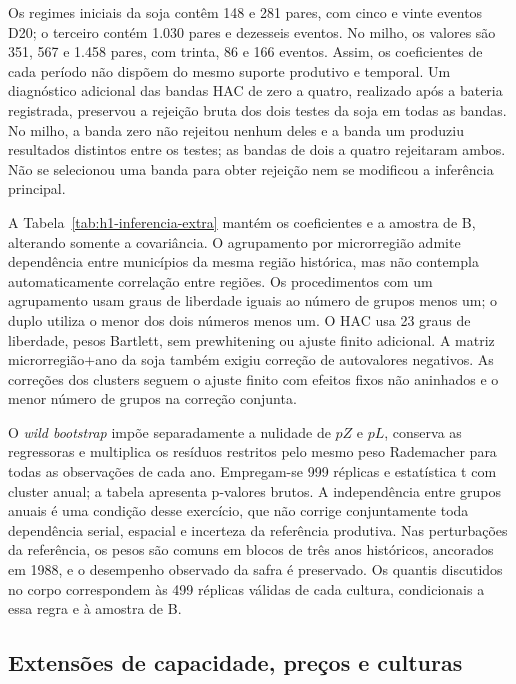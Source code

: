 
\FloatBarrier

Os regimes iniciais da soja contêm 148 e 281 pares, com cinco e vinte eventos D20; o terceiro contém 1.030 pares e dezesseis eventos. No milho, os valores são 351, 567 e 1.458 pares, com trinta, 86 e 166 eventos. Assim, os coeficientes de cada período não dispõem do mesmo suporte produtivo e temporal. Um diagnóstico adicional das bandas HAC de zero a quatro, realizado após a bateria registrada, preservou a rejeição bruta dos dois testes da soja em todas as bandas. No milho, a banda zero não rejeitou nenhum deles e a banda um produziu resultados distintos entre os testes; as bandas de dois a quatro rejeitaram ambos. Não se selecionou uma banda para obter rejeição nem se modificou a inferência principal.

A Tabela~\ref{tab:h1-inferencia-extra} mantém os coeficientes e a amostra de B, alterando somente a covariância. O agrupamento por microrregião admite dependência entre municípios da mesma região histórica, mas não contempla automaticamente correlação entre regiões. Os procedimentos com um agrupamento usam graus de liberdade iguais ao número de grupos menos um; o duplo utiliza o menor dos dois números menos um. O HAC usa 23 graus de liberdade, pesos Bartlett, sem prewhitening ou ajuste finito adicional. A matriz microrregião+ano da soja também exigiu correção de autovalores negativos. As correções dos clusters seguem o ajuste finito com efeitos fixos não aninhados e o menor número de grupos na correção conjunta.


\FloatBarrier

O \textit{wild bootstrap} impõe separadamente a nulidade de $pZ$ e $pL$, conserva as regressoras e multiplica os resíduos restritos pelo mesmo peso Rademacher para todas as observações de cada ano. Empregam-se 999 réplicas e estatística t com cluster anual; a tabela apresenta p-valores brutos. A independência entre grupos anuais é uma condição desse exercício, que não corrige conjuntamente toda dependência serial, espacial e incerteza da referência produtiva. Nas perturbações da referência, os pesos são comuns em blocos de três anos históricos, ancorados em 1988, e o desempenho observado da safra é preservado. Os quantis discutidos no corpo correspondem às 499 réplicas válidas de cada cultura, condicionais a essa regra e à amostra de B.

\subsection{Extensões de capacidade, preços e culturas}

